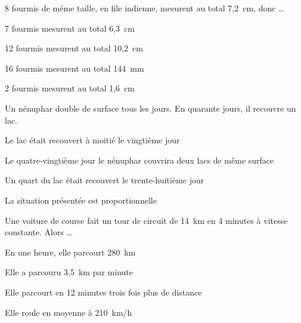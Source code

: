 \begin{QCM}
\begin{GroupeQCM}
    
    \begin{exercice}
      8 fourmis de même taille, en file indienne, mesurent au total 7,2 cm, donc \ldots
      \begin{ChoixQCM}{4}
      \item 7 fourmis   mesurent au total 6,3 cm
      \item 12 fourmis   mesurent au total 10,2 cm
      \item 16 fourmis mesurent au total 144 mm
      \item 2 fourmis mesurent au total 1,6 cm
      \end{ChoixQCM}
\begin{corrige}
   \end{corrige}
    \end{exercice}
    
    
     \begin{exercice}
      Un nénuphar double de surface tous les jours. En quarante jours, il recouvre un lac.
      \begin{ChoixQCM}{4}
      \item Le lac était recouvert à moitié le vingtième jour
      \item Le quatre‑vingtième jour le nénuphar couvrira deux lacs de même surface
      \item Un quart du lac était recouvert le trente‑huitième jour
      \item La situation présentée est proportionnelle
      \end{ChoixQCM}
\begin{corrige}
   \end{corrige}
    \end{exercice}
    
    
     \begin{exercice}
      Une voiture de course fait un tour de circuit de  14 km en 4 minutes à vitesse constante. Alors \ldots
      \begin{ChoixQCM}{4}
      \item En une heure, elle parcourt 280 km
      \item Elle a parcouru 3,5 km par minute
      \item Elle parcourt en 12 minutes trois fois plus de distance
      \item Elle roule en moyenne à 210 km/h
      \end{ChoixQCM}
\begin{corrige}
   \end{corrige}
    \end{exercice}

\end{GroupeQCM}
\end{QCM}

  
